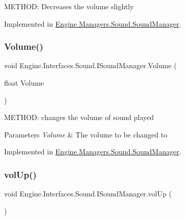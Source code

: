 M\+E\+T\+H\+OD\+: Decreases the volume slightly 



Implemented in \hyperlink{a00546_a888a7942f63cc582f7b73d61b69ebbac}{Engine.\+Managers.\+Sound.\+Sound\+Manager}.

\mbox{\label{a00482_ada3f38d5c50655b55f146ccdaf7c5967}} 
\subsubsection{\texorpdfstring{Volume()}{Volume()}}
{\footnotesize\ttfamily void Engine.\+Interfaces.\+Sound.\+I\+Sound\+Manager.\+Volume (\begin{DoxyParamCaption}\item[{float}]{Volume }\end{DoxyParamCaption})}



M\+E\+T\+H\+OD\+: changes the volume of sound played 


\begin{DoxyParams}{Parameters}
{\em Volume} & The volume to be changed to\\
\hline
\end{DoxyParams}


Implemented in \hyperlink{a00546_ae1be3ecb76007fdc47843305df49604b}{Engine.\+Managers.\+Sound.\+Sound\+Manager}.

\mbox{\label{a00482_afe3eaaed21c8b64692bc338309ac4a4d}} 
\subsubsection{\texorpdfstring{vol\+Up()}{volUp()}}
{\footnotesize\ttfamily void Engine.\+Interfaces.\+Sound.\+I\+Sound\+Manager.\+vol\+Up (\begin{DoxyParamCaption}{ }\end{DoxyParamCaption})}



